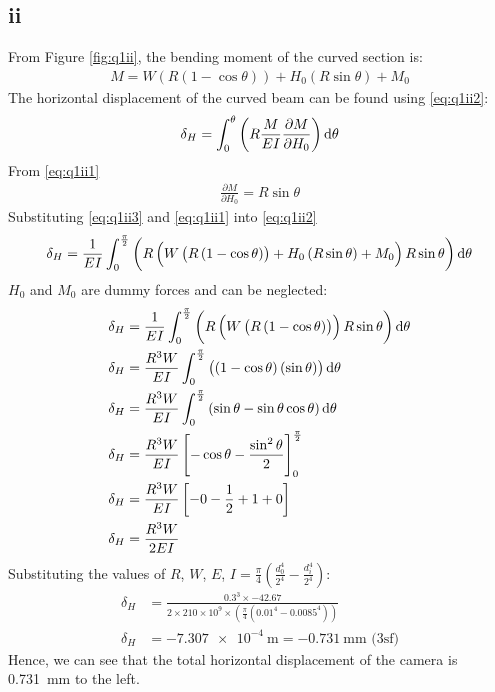 \documentclass[11pt]{article}
\numberwithin{equation}{section}
\begin{document}
\subsection{ii}
From Figure \ref{fig:q1ii}, the bending moment of the curved section is:
\begin{align}
    M = W\left(R\left(1-\cos\theta\right)\right)+ H_0 \left(R\sin\theta\right) + M_0 \label{eq:q1ii1}
\end{align}
The horizontal displacement of the curved beam can be found using \ref{eq:q1ii2}: 
\begin{equation}
    \delta_H = \int_0^{\theta} \left(R\frac{M}{EI}\frac{\partial M}{\partial H_0}\right)\dif \theta \label{eq:q1ii2}
\end{equation}
From \ref{eq:q1ii1}
\begin{align}
    \frac{\partial M}{\partial H_0} = R\sin\theta \label{eq:q1ii3}
\end{align}
Substituting \ref{eq:q1ii3} and \ref{eq:q1ii1} into \ref{eq:q1ii2}
\begin{align}
    \delta_H = \frac{1}{EI}\int_0^{\frac{\pi}{2}} \left(R\left(W\left(R\left(1-\cos\theta\right)\right) + H_0\left(R\sin\theta\right) + M_0\right)R\sin\theta\right)\dif \theta
\end{align}
$H_0$ and $M_0$ are dummy forces and can be neglected:
\begin{align}
    \delta_H &= \frac{1}{EI}\int_0^{\frac{\pi}{2}} \left(R\left(W\left(R\left(1-\cos\theta\right)\right)\right)R\sin\theta\right)\dif \theta\\
    \delta_H &= \frac{R^3W}{EI}\int_0^{\frac{\pi}{2}} \left(\left(1-\cos\theta\right)\left(\sin\theta\right)\right)\dif \theta\\
    \delta_H &= \frac{R^3W}{EI}\int_0^{\frac{\pi}{2}} \left(\sin\theta - \sin\theta\cos\theta\right)\dif \theta\\
    \delta_H &= \frac{R^3W}{EI}\left[-\cos\theta - \frac{\sin^2\theta}{2}\right]_0^{\frac{\pi}{2}}\\
    \delta_H &= \frac{R^3W}{EI}\left[-0 -\frac{1}{2}+1 + 0\right]\\
    \delta_H &= \frac{R^3W}{2EI}
\end{align}
Substituting the values of $R$, $W$, $E$, $I = \frac{\pi}{4}\left(\frac{d_0^4}{2^4}-\frac{d_i^4}{2^4}\right)$:
\begin{align}
    \delta_H &= \frac{0.3^3\times -42.67}{2\times 210\times 10^{9} \times \left(\frac{\pi}{4}\left(0.01^4 - 0.0085^4\right)\right)}\\
    \delta_H &= \SI{-7.307e-4}{\meter} = \SI{-0.731}{\milli \meter}\textrm{ (3sf)}
\end{align}
Hence, we can see that the total horizontal displacement of the camera is \SI{0.731}{\milli\meter} to the left. 
\end{document}

